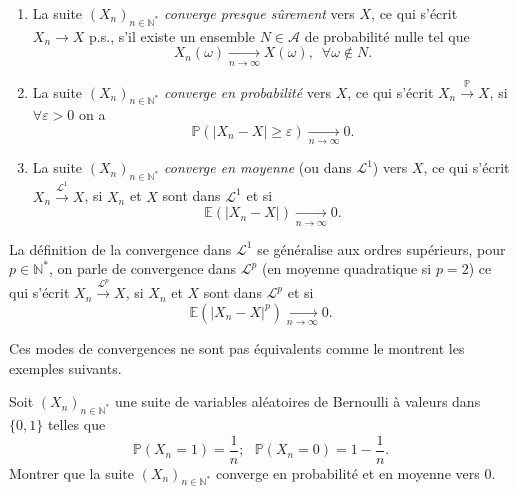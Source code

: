 \begin{definition}\label{IV-modes-de-convergences}

\begin{enumerate}
\def\labelenumi{\arabic{enumi}.}
\tightlist
\item
  La suite \((X_n)_{n\in \mathbb{N}^\ast}\) \emph{converge presque
  sûrement} vers \(X\), ce qui s'écrit \(X_n \to X\) p.s., s'il existe
  un ensemble \(N \in \mathcal{A}\) de probabilité nulle tel que
  \[ X_n (\omega) \xrightarrow[n \to \infty]{}  X(\omega),\,\,\, \forall \omega \notin N.\]
\item
  La suite \((X_n)_{n\in \mathbb{N}^\ast}\) \emph{converge en
  probabilité} vers \(X\), ce qui s'écrit
  \(X_n \xrightarrow{\mathbb{P}} X\), si \(\forall \varepsilon >0\) on a
  \[ \mathbb{P}(|X_n-X| \geq \varepsilon) \xrightarrow[n \to \infty]{}  0. \]
\item
  La suite \((X_n)_{n\in \mathbb{N}^\ast}\) \emph{converge en moyenne}
  (ou dans \(\mathcal{L}^1\)) vers \(X\), ce qui s'écrit
  \(X_n \xrightarrow{\mathcal{L}^1} X\), si \(X_n\) et \(X\) sont dans
  \(\mathcal{L}^1\) et si
  \[ \mathbb{E}(|X_n - X|) \xrightarrow[n \to \infty]{}  0 .\]
\end{enumerate}
\end{definition}

\begin{remarque}\label{IV-convergence-mathcallp}

La définition de la convergence dans \(\mathcal{L}^1\) se généralise aux
ordres supérieurs, pour \(p \in \mathbb{N}^\ast\), on parle de
convergence dans \(\mathcal{L}^p\) (en moyenne quadratique si \(p=2\))
ce qui s'écrit \(X_n \xrightarrow{\mathcal{L}^p} X\), si \(X_n\) et
\(X\) sont dans \(\mathcal{L}^p\) et si
\[ \mathbb{E}(|X_n - X|^p) \xrightarrow[n \to \infty]{}  0 .\]

Ces modes de convergences ne sont pas équivalents comme le montrent les
exemples suivants.
\end{remarque}

\label{IV-lien}
Soit \((X_n)_{n\in \mathbb{N}^\ast}\) une suite de variables aléatoires
de Bernoulli à valeurs dans \(\{0,1\}\) telles que
\[ \mathbb{P}(X_n=1) = \frac{1}{n} ;\,\,\,\, \mathbb{P}(X_n = 0) = 1- \frac{1}{n}.\]
Montrer que la suite \((X_n)_{n\in \mathbb{N}^\ast}\) converge en
probabilité et en moyenne vers 0.

